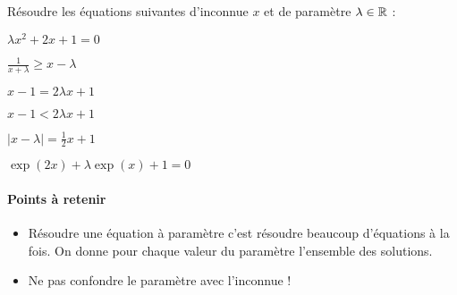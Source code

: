 \documentclass[a4paper, 11pt]{article}
\newcommand{\subscript}[2]{$#1 _ #2$}
\begin{document}
\begin{exercice}
Résoudre les équations suivantes d'inconnue $x$ et de paramètre $\lambda \in \mathbb{R}$ :\\

\begin{enumerate}[label=(\subscript{P}{{\arabic*}}) : $\,$]
\hspace{1cm}
\begin{minipage}{0.3\textwidth}
        \item $ \lambda x^2 +2x+1 =0$\\
        \item $ \frac{1}{x+\lambda}\geq x-\lambda$
    \end{minipage}
    \begin{minipage}{0.3\textwidth}
        \item $  x -1 =2\lambda x +1$\\
        \item $  x -1 <2\lambda x +1$
    \end{minipage}
    \begin{minipage}{0.3\textwidth}
        \item $|x-\lambda| = \frac{1}{2}x+1 $\\
        \item $ \exp(2x) + \lambda \exp(x) +1=0$
    \end{minipage}
\end{enumerate}
\end{exercice}

\paragraph{Points à retenir}
\begin{itemize}
    \item Résoudre une équation à paramètre c'est résoudre beaucoup d'équations à la fois. On donne pour chaque valeur du paramètre l'ensemble des solutions. 
    \item Ne pas confondre le paramètre avec l'inconnue ! 
\end{itemize}
\end{document}

